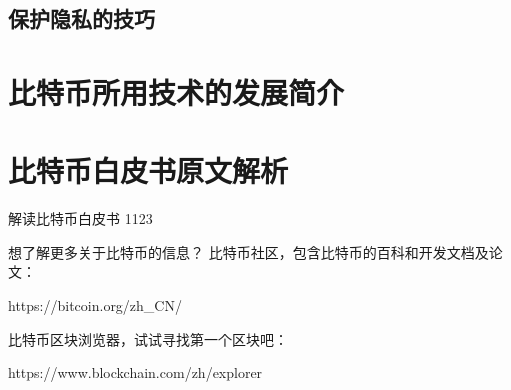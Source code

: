 \documentclass[11pt]{beamer}
\begin{document}
\subsection{保护隐私的技巧}

\section{比特币所用技术的发展简介}

\section{比特币白皮书原文解析}


\begin{frame}{解读比特币白皮书}
	1123
\end{frame}

\begin{frame}{想了解更多关于比特币的信息？}
	\centering
比特币社区，包含比特币的百科和开发文档及论文：

https://bitcoin.org/zh\_CN/

\hfil

比特币区块浏览器，试试寻找第一个区块吧：

https://www.blockchain.com/zh/explorer

\end{frame}
\end{document}
